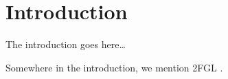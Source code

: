 \section{Introduction}

The introduction goes here\ldots

Somewhere in the introduction, we mention 2FGL \citep{second_lat_catalog}.
